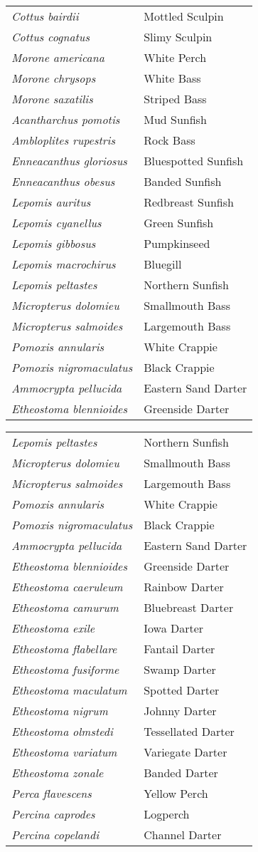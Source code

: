 \documentclass[11pt]{article}
\begin{document}
\vspace{\baselineskip}

%
\textbf{\Student}

\begin{tabular}{@{}L{3in}L{3in}@{}}
\textit{Cottus bairdii} & Mottled Sculpin\tabularnewline
\textit{Cottus cognatus} & Slimy Sculpin\tabularnewline
\textit{Morone americana} & White Perch\tabularnewline
\textit{Morone chrysops} & White Bass\tabularnewline
\textit{Morone saxatilis} & Striped Bass\tabularnewline
\textit{Acantharchus pomotis} & Mud Sunfish\tabularnewline
\textit{Ambloplites rupestris} & Rock Bass\tabularnewline
\textit{Enneacanthus gloriosus} & Bluespotted Sunfish\tabularnewline
\textit{Enneacanthus obesus} & Banded Sunfish\tabularnewline
\textit{Lepomis auritus} & Redbreast Sunfish\tabularnewline
\textit{Lepomis cyanellus} & Green Sunfish\tabularnewline
\textit{Lepomis gibbosus} & Pumpkinseed\tabularnewline
\textit{Lepomis macrochirus} & Bluegill\tabularnewline
\textit{Lepomis peltastes} & Northern Sunfish\tabularnewline
\textit{Micropterus dolomieu} & Smallmouth Bass\tabularnewline
\textit{Micropterus salmoides} & Largemouth Bass\tabularnewline
\textit{Pomoxis annularis} & White Crappie\tabularnewline
\textit{Pomoxis nigromaculatus} & Black Crappie\tabularnewline
\textit{Ammocrypta pellucida} & Eastern Sand Darter\tabularnewline
\textit{Etheostoma blennioides} & Greenside Darter\tabularnewline
\end{tabular}

\newpage

\vspace{\baselineskip}

%
\textbf{\Student}

\begin{tabular}{@{}L{3in}L{3in}@{}}
\textit{Lepomis peltastes} & Northern Sunfish\tabularnewline
\textit{Micropterus dolomieu} & Smallmouth Bass\tabularnewline
\textit{Micropterus salmoides} & Largemouth Bass\tabularnewline
\textit{Pomoxis annularis} & White Crappie\tabularnewline
\textit{Pomoxis nigromaculatus} & Black Crappie\tabularnewline
\textit{Ammocrypta pellucida} & Eastern Sand Darter\tabularnewline
\textit{Etheostoma blennioides} & Greenside Darter\tabularnewline
\textit{Etheostoma caeruleum} & Rainbow Darter\tabularnewline
\textit{Etheostoma camurum} & Bluebreast Darter\tabularnewline
\textit{Etheostoma exile} & Iowa Darter\tabularnewline
\textit{Etheostoma flabellare} & Fantail Darter\tabularnewline
\textit{Etheostoma fusiforme} & Swamp Darter\tabularnewline
\textit{Etheostoma maculatum} & Spotted Darter\tabularnewline
\textit{Etheostoma nigrum} & Johnny Darter\tabularnewline
\textit{Etheostoma olmstedi} & Tessellated Darter\tabularnewline
\textit{Etheostoma variatum} & Variegate Darter\tabularnewline
\textit{Etheostoma zonale} & Banded Darter\tabularnewline
\textit{Perca flavescens} & Yellow Perch\tabularnewline
\textit{Percina caprodes} & Logperch\tabularnewline
\textit{Percina copelandi} & Channel Darter\tabularnewline
\end{tabular}
\end{document}
